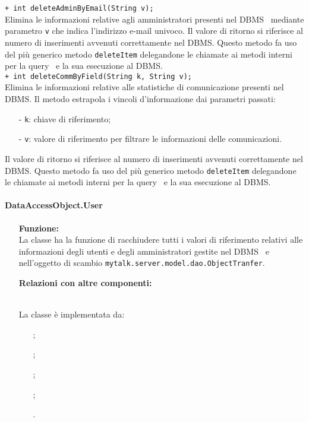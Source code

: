 {\begin{sloppypar}
{{{{\begin{itemize}
{				\texttt{+ int deleteAdminByEmail(String v);}\\
				Elimina le informazioni relative agli amministratori presenti nel DBMS\g~ mediante parametro \texttt{v} che indica l'indirizzo e-mail univoco.
				Il valore  di ritorno si riferisce al numero di inserimenti avvenuti correttamente nel DBMS\g.
				Questo metodo fa uso del più generico metodo \texttt{deleteItem} delegandone le chiamate ai metodi interni per la query\g~ e la sua esecuzione al DBMS\g.\\
				
				\texttt{+ int deleteCommByField(String k, String v);}\\
				Elimina le informazioni relative alle statistiche di comunicazione presenti nel DBMS\g.
				Il metodo estrapola i vincoli d'informazione dai parametri passati:
				\begin{itemize}
					\item[-] \texttt{k}: chiave di riferimento;
					\item[-] \texttt{v}: valore di riferimento per filtrare le informazioni delle comunicazioni.
				\end{itemize}
				Il valore  di ritorno si riferisce al numero di inserimenti avvenuti correttamente nel DBMS\g.
				Questo metodo fa uso del più generico metodo \texttt{deleteItem} delegandone le chiamate ai metodi interni per la query\g~ e la sua esecuzione al DBMS\g.\\
				}
			\end{itemize}
		}%


		\paragraph{DataAccessObject.User}\label{par:DataAccessObjectUser}{
			\begin{itemize}
			
				\item[] \textbf{Funzione:}{\\
				La classe ha la funzione di racchiudere tutti i valori di riferimento relativi alle informazioni degli utenti e degli amministratori gestite nel DBMS\g~ e nell'oggetto di scambio \texttt{mytalk.server.model.dao.ObjectTranfer}.\\
				 }
			
			\item[] \textbf{Relazioni con altre componenti:}{\\			
				La classe è implementata da:
					\begin{itemize}
						\item[] ;
						\item[] ;
						\item[] ;
						\item[]	;
						\item[]	.\\
					\end{itemize}
				}
				

\end{itemize}}}}}
\end{sloppypar}}
